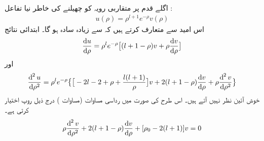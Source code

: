   اگلے قدم پر متقاربی رویہ  کو چھیلنے کی خاطر  نیا تفاعل :
  \begin{align}\label{مساوات_ابعادی_نئی_علامتیت}
u(\rho)=\rho^{l+1}e^{-\rho}v(\rho) 
\end{align}
  اس امید سے متعارف کرتے ہیں کہ         سے   زیادہ سادہ ہو گا۔ ابتدائی نتائج 
\begin{align*}
\frac{\dif u}{\dif \rho}=\rho^l e^{-\rho} \big[(l+1-\rho)v+\rho\frac{\dif v}{\dif \rho}\big]
\end{align*}
اور
\begin{align*}
\frac{\dif^{\,2}u}{\dif \rho^2}=\rho^le^{-\rho}\big\{\big[-2l-2+\rho+\frac{l(l+1)}{\rho}\big]v+2(l+1-\rho)\frac{\dif v}{\dif \rho}+\rho\frac{\dif^{\,2}v}{\dif \rho^2}\big\}
\end{align*}
خوش آئین نظر نہیں آتے ہیں۔   اس طرح  کی صورت میں رداسی مساوات (مساوات )   درج ذیل روپ اختیار کرتی ہے۔
  \begin{align}\label{مساوات_ابعادی_رداسی_نئی_روپ}
\rho\frac{\dif^{\,2}{v}}{\dif{\rho^{2}}}+2(l+1-\rho)\frac{\dif{v}}{\dif{\rho}}+[\rho_{0}-2(l+1)]v=0 
\end{align}

